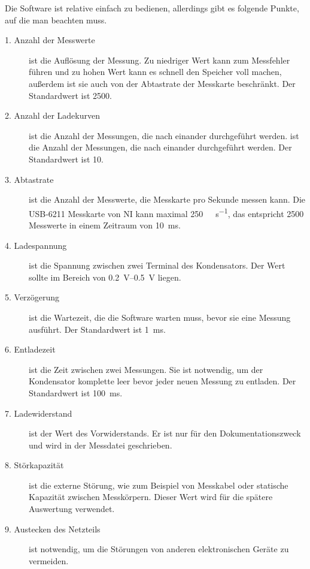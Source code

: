 Die Software ist relative einfach zu bedienen, allerdings gibt es folgende Punkte, auf die man beachten muss.
\begin{description}
    \item[1. Anzahl der Messwerte] ist die Auflösung der Messung.
        Zu niedriger Wert kann zum Messfehler führen und zu hohen Wert kann es schnell den Speicher voll machen, außerdem ist sie auch von der Abtastrate der Messkarte beschränkt.
        Der Standardwert ist \num{2500}.

    \item[2. Anzahl der Ladekurven] ist die Anzahl der Messungen, die nach einander durchgeführt werden. ist die Anzahl der Messungen, die nach einander durchgeführt werden.
        Der Standardwert ist \num{10}.

    \item[3. Abtastrate] ist die Anzahl der Messwerte, die Messkarte pro Sekunde messen kann.
        Die USB-6211 Messkarte von NI kann maximal \SI[per-mode=symbol]{250}{\kilo\sample\per\second}, das entspricht \num{2500} Messwerte in einem Zeitraum von \SI{10}{\milli\second}.

    \item[4. Ladespannung] ist die Spannung zwischen zwei Terminal des Kondensators.
        Der Wert sollte im Bereich von \SIrange{0.2}{0.5}{\volt} liegen.

    \item[5. Verzögerung] ist die Wartezeit, die die Software warten muss, bevor sie eine Messung ausführt.
        Der Standardwert ist \SI{1}{\ms}.

    \item[6. Entladezeit] ist die Zeit zwischen zwei Messungen.
        Sie ist notwendig, um der Kondensator komplette leer bevor jeder neuen Messung zu entladen.
        Der Standardwert ist \SI{100}{\ms}.

    \item[7. Ladewiderstand] ist der Wert des Vorwiderstands.
        Er ist nur für den Dokumentationszweck und wird in der Messdatei geschrieben.

    \item[8. Störkapazität] ist die externe Störung, wie zum Beispiel von Messkabel oder statische Kapazität zwischen Messkörpern.
        Dieser Wert wird für die spätere Auswertung verwendet.

    \item[9. Austecken des Netzteils] ist notwendig, um die Störungen von anderen elektronischen Geräte zu vermeiden.
\end{description}

